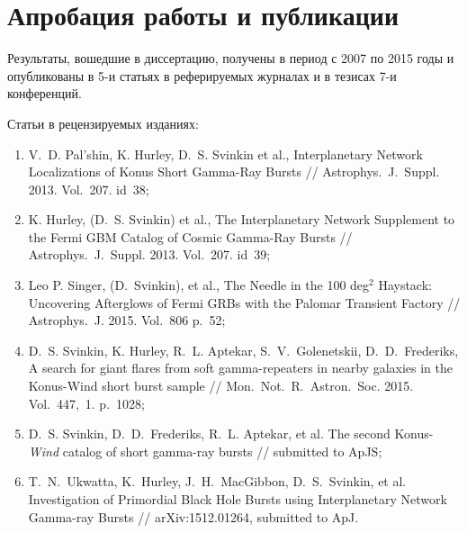 \section*{Апробация работы и публикации}
Результаты, вошедшие в диссертацию, получены в период с 2007 по 2015
годы и опубликованы в 5-и статьях в реферируемых журналах и в тезисах 7-и конференций. 

Статьи в рецензируемых изданиях:
\begin{enumerate}
\item V.~D. Pal'shin, K. Hurley, D.~S. Svinkin et al., Interplanetary Network Localizations of
Konus Short Gamma-Ray Bursts // Astrophys.~J.~Suppl. 2013. Vol.~207. id~38;
\item K. Hurley, (D.~S. Svinkin) et al., The Interplanetary Network Supplement to 
the Fermi GBM Catalog of Cosmic Gamma-Ray Bursts // Astrophys.~J.~Suppl. 2013. Vol.~207. id~39;
\item Leo P. Singer, (D.~Svinkin), et al., The Needle in the 100 deg$^2$ Haystack: 
Uncovering Afterglows of Fermi GRBs with the Palomar Transient Factory // 
Astrophys.~J. 2015. Vol.~806 p.~52;
\item D.~S. Svinkin, K. Hurley, R.~L. Aptekar, S.~V.~Golenetskii, D.~D.~Frederiks, 
A search for giant flares from soft gamma-repeaters in nearby galaxies in the 
Konus-Wind short burst sample // Mon.~Not.~R.~Astron.~Soc. 2015. Vol.~447,~1. p.~1028;
\item D.~S. Svinkin, D.~D.~Frederiks, R.~L. Aptekar, et al.
The second Konus-\textit{Wind} catalog of short gamma-ray bursts // submitted to ApJS;
\item T.~N.~Ukwatta, K.~Hurley, J.~H.~MacGibbon, D.~S.~Svinkin, et al.
Investigation of Primordial Black Hole Bursts using Interplanetary Network Gamma-ray Bursts // 
arXiv:1512.01264, submitted to ApJ.

\end{enumerate}

